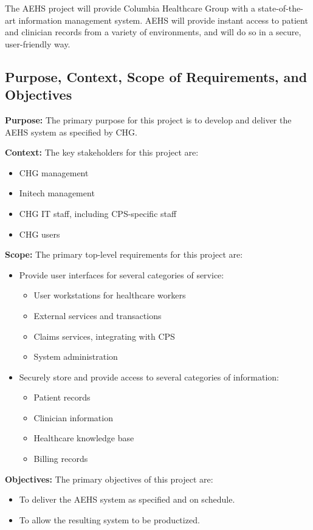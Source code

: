 \documentclass[11pt]{article}
\begin{document}
The AEHS project will provide Columbia Healthcare Group with a state-of-the-art information
management system.  AEHS will provide instant access to patient and clinician records from a variety
of environments, and will do so in a secure, user-friendly way.


\subsection{Purpose, Context, Scope of Requirements, and Objectives}

\textbf{Purpose:} The primary purpose for this project is to develop and deliver the AEHS system as
specified by CHG.

\textbf{Context:} The key stakeholders for this project are:
\begin{itemize}
\item CHG management
\item Initech management
\item CHG IT staff, including CPS-specific staff
\item CHG users
\end{itemize}

\textbf{Scope:} The primary top-level requirements for this project are:
\begin{itemize}
\item Provide user interfaces for several categories of service:
  \begin{itemize}
  \item User workstations for healthcare workers
  \item External services and transactions
  \item Claims services, integrating with CPS
  \item System administration
  \end{itemize}
\item Securely store and provide access to several categories of information:
  \begin{itemize}
  \item Patient records
  \item Clinician information
  \item Healthcare knowledge base
  \item Billing records
  \end{itemize}
\end{itemize}


\textbf{Objectives:} The primary objectives of this project are:
\begin{itemize}
\item To deliver the AEHS system as specified and on schedule.
\item To allow the resulting system to be productized.
\end{itemize}
\end{document}
